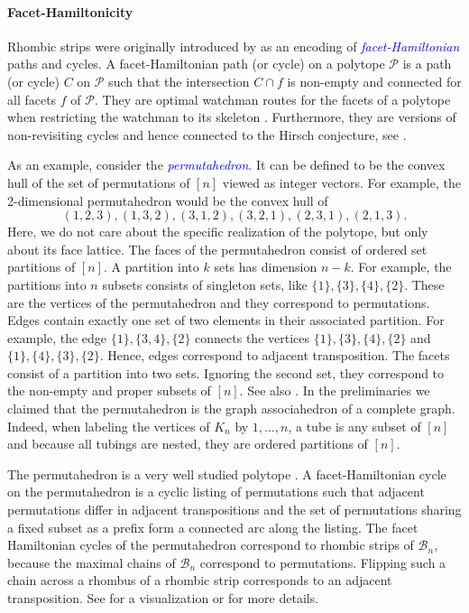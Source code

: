 \documentclass[fontsize=11pt,a4paper,DIV=12]{scrartcl}
\newcommand{\defn}[1]{\textsl{\textcolor{Blue}{#1}}}
\begin{document}
\paragraph{Facet-Hamiltonicity}
Rhombic strips were originally introduced by \textcite{facethamiltonicity} as an encoding of \defn{facet-Hamiltonian} paths and cycles. A facet-Hamiltonian path (or cycle) on a polytope $\mathcal P$ is a path (or cycle) $C$ on $\mathcal P$ such that the intersection $C\cap f$ is non-empty and connected for all facets $f$ of $\mathcal P$. They are optimal watchman routes for the facets of a polytope when restricting the watchman to its skeleton \cite{watchmanChin, watchmanLines, watchmanSimple, watchmanApproximation}. Furthermore, they are versions of non-revisiting cycles and hence connected to the Hirsch conjecture, see \cite{non-revisiting1, non-revisiting2, non-revisiting3, non-revisiting4, non-revisiting5}.

As an example, consider the \defn{permutahedron}. It can be defined to be the convex hull of the set of permutations of $[n]$ viewed as integer vectors. For example, the 2-dimensional permutahedron would be the convex hull of
\[
    (1,2,3),(1,3,2),(3,1,2),(3,2,1),(2,3,1),(2,1,3).
\]
Here, we do not care about the specific realization of the polytope, but only about its face lattice. The faces of the permutahedron consist of ordered set partitions of $[n]$. A partition into $k$ sets has dimension $n-k$. For example, the partitions into $n$ subsets consists of singleton sets, like $\{1\},\{3\},\{4\},\{2\}$. These are the vertices of the permutahedron and they correspond to permutations. Edges contain exactly one set of two elements in their associated partition. For example, the edge $\{1\},\{3,4\},\{2\}$ connects the vertices $\{1\},\{3\},\{4\},\{2\}$ and $\{1\},\{4\},\{3\},\{2\}$. Hence, edges correspond to adjacent transposition. The facets consist of a partition into two sets. Ignoring the second set, they correspond to the non-empty and proper subsets of $[n]$. See also . In the preliminaries we claimed that the permutahedron is the graph associahedron of a complete graph. Indeed, when labeling the vertices of $K_n$ by $1,\ldots,n$, a tube is any subset of $[n]$ and because all tubings are nested, they are ordered partitions of $[n]$.

The permutahedron is a very well studied polytope \cite{Permutahedra_associahedra_beyond, Permutahedron_and_gen_associahedron}. A facet-Hamiltonian cycle on the permutahedron is a cyclic listing of permutations such that adjacent permutations differ in adjacent transpositions and the set of permutations sharing a fixed subset as a prefix form a connected arc along the listing. The facet Hamiltonian cycles of the permutahedron correspond to rhombic strips of $\mathcal B_n$, because the maximal chains of $\mathcal B_n$ correspond to permutations. Flipping such a chain across a rhombus of a rhombic strip corresponds to an adjacent transposition. See   for a visualization or \cite{facethamiltonicity} for more details.
\end{document}
